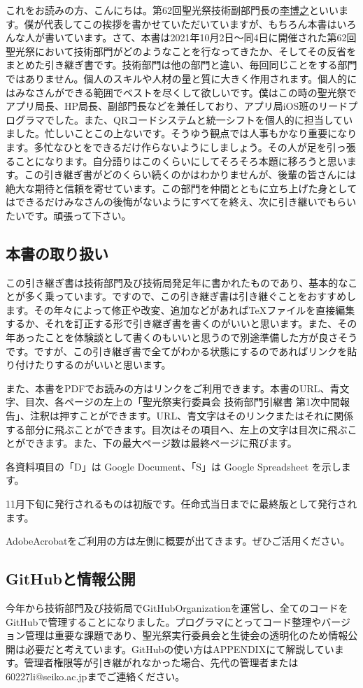 \documentclass[dvipdfmx,jb5]{jarticle}
\newcommand{\mail}[2]{\href{mailto:#2}{#1}}
\begin{document}
これをお読みの方、こんにちは。第62回聖光祭技術副部門長の\mail{李博之}{60227li@seiko.ac.jp}といいます。僕が代表してこの挨拶を書かせていただいていますが、もちろん本書はいろんな人が書いています。さて、本書は2021年10月2日〜同4日に開催された第62回聖光祭において技術部門がどのようなことを行なってきたか、そしてその反省をまとめた引き継ぎ書です。技術部門は他の部門と違い、毎回同じことをする部門ではありません。個人のスキルや人材の量と質に大きく作用されます。個人的にはみなさんができる範囲でベストを尽くして欲しいです。僕はこの時の聖光祭でアプリ局長、HP局長、副部門長などを兼任しており、アプリ局iOS班のリードプログラマでした。また、QRコードシステムと統一シフトを個人的に担当していました。忙しいことこの上ないです。そうゆう観点では人事もかなり重要になります。多忙なひとをできるだけ作らないようにしましょう。その人が足を引っ張ることになります。自分語りはこのくらいにしてそろそろ本題に移ろうと思います。この引き継ぎ書がどのくらい続くのかはわかりませんが、後輩の皆さんには絶大な期待と信頼を寄せています。この部門を仲間とともに立ち上げた身としてはできるだけみなさんの後悔がないようにすべてを終え、次に引き継いでもらいたいです。頑張って下さい。
\subsection{本書の取り扱い}
この引き継ぎ書は技術部門及び技術局発足年に書かれたものであり、基本的なことが多く乗っています。ですので、この引き継ぎ書は引き継ぐことをおすすめします。その年々によって修正や改変、追加などがあれば\TeX ファイルを直接編集するか、それを訂正する形で引き継ぎ書を書くのがいいと思います。また、その年あったことを体験談として書くのもいいと思うので別途準備した方が良さそうです。ですが、この引き継ぎ書で全てがわかる状態にするのであればリンクを貼り付けたりするのがいいと思います。

また、本書をPDFでお読みの方はリンクをご利用できます。本書のURL、青文字、目次、各ページの左上の「聖光祭実行委員会 技術部門引継書 第1次中間報告」、注釈は押すことができます。URL、青文字はそのリンクまたはそれに関係する部分に飛ぶことができます。目次はその項目へ、左上の文字は目次に飛ぶことができます。また、下の最大ページ数は最終ページに飛びます。

各資料項目の「D」は Google Document、「S」は Google Spreadsheet を示します。

11月下旬に発行されるものは初版です。任命式当日までに最終版として発行されます。

AdobeAcrobatをご利用の方は左側に概要が出てきます。ぜひご活用ください。
\subsection{GitHubと情報公開}
今年から技術部門及び技術局でGitHubOrganizationを運営し、全てのコードをGitHubで管理することになりました。プログラマにとってコード整理やバージョン管理は重要な課題であり、聖光祭実行委員会と生徒会の透明化のため情報公開は必要だと考えています。GitHubの使い方はAPPENDIXにて解説しています。管理者権限等が引き継がれなかった場合、先代の管理者または {\ttfamily 60227li@seiko.ac.jp}までご連絡ください。
\end{document}
